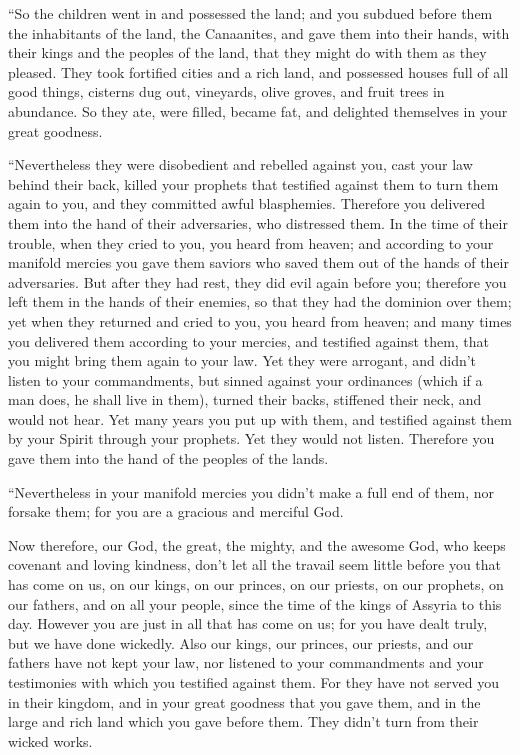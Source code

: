 \myverse{}“So the children went in and possessed the land; and you subdued
before them the inhabitants of the land, the Canaanites, and gave them into their hands, with their kings
and the peoples of the land, that they might do with them as they pleased.
\myverse{}They took fortified cities and a rich land, and possessed houses full of all
good things, cisterns dug out, vineyards, olive groves, and fruit trees in abundance. So they ate, were
filled, became fat, and delighted themselves in your great goodness.

\myverse{}“Nevertheless they were disobedient and rebelled against you,
cast your law behind their back, killed your prophets that testified against them to turn them again to
you, and they committed awful blasphemies.
\myverse{}Therefore you delivered them into the hand of their adversaries, who distressed
them. In the time of their trouble, when they cried to you, you heard from heaven; and according to your
manifold mercies you gave them saviors who saved them out of the hands of their adversaries.
\myverse{}But after they had rest, they did evil again before you; therefore you left
them in the hands of their enemies, so that they had the dominion over them; yet when they returned and
cried to you, you heard from heaven; and many times you delivered them according to your mercies,
\myverse{}and testified against them, that you might bring them again to your law. Yet
they were arrogant, and didn’t listen to your commandments, but sinned against your ordinances (which
if a man does, he shall live in them), turned their backs, stiffened their neck, and would not hear.
\myverse{}Yet many years you put up with them, and testified against them by your Spirit
through your prophets. Yet they would not listen. Therefore you gave them into the hand of the peoples
of the lands.

\myverse{}“Nevertheless in your manifold mercies you didn’t make a full
end of them, nor forsake them; for you are a gracious and merciful God.

\myverse{}Now therefore, our God, the great, the mighty, and the awesome
God, who keeps covenant and loving kindness, don’t let all the travail seem little before you that has
come on us, on our kings, on our princes, on our priests, on our prophets, on our fathers, and on all
your people, since the time of the kings of Assyria to this day.
\myverse{}However you are just in all that has come on us; for you have dealt truly,
but we have done wickedly.
\myverse{}Also our kings, our princes, our priests, and our fathers have not kept your
law, nor listened to your commandments and your testimonies with which you testified against them.
\myverse{}For they have not served you in their kingdom, and in your great goodness
that you gave them, and in the large and rich land which you gave before them. They didn’t turn from their
wicked works.

